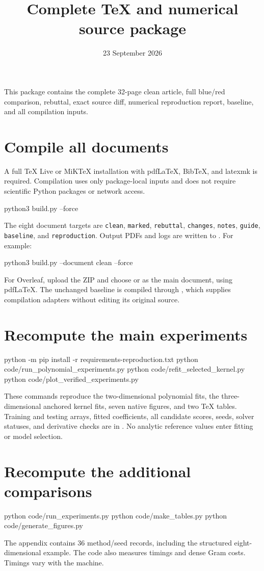 \documentclass[11pt,a4paper]{article}
\title{Complete TeX and numerical source package}\author{}\date{23 September 2026}
\begin{document}
\maketitle
This package contains the complete 32-page clean article, full blue/red comparison, rebuttal, exact source diff, numerical reproduction report, baseline, and all compilation inputs.
\section*{Compile all documents}
A full TeX Live or MiKTeX installation with pdfLaTeX, BibTeX, and latexmk is required. Compilation uses only package-local inputs and does not require scientific Python packages or network access.
\begin{Commands}
python3 build.py --force
\end{Commands}
The eight document targets are \texttt{clean}, \texttt{marked}, \texttt{rebuttal}, \texttt{changes}, \texttt{notes}, \texttt{guide}, \texttt{baseline}, and \texttt{reproduction}. Output PDFs and logs are written to . For example:
\begin{Commands}
python3 build.py --document clean --force
\end{Commands}
For Overleaf, upload the ZIP and choose  or  as the main document, using pdfLaTeX. The unchanged baseline is compiled through , which supplies compilation adapters without editing its original source.

\section*{Recompute the main experiments}
\begin{Commands}
python -m pip install -r requirements-reproduction.txt
python code/run_polynomial_experiments.py
python code/refit_selected_kernel.py
python code/plot_verified_experiments.py
\end{Commands}
These commands reproduce the two-dimensional polynomial fits, the three-dimensional anchored kernel fits, seven native figures, and two TeX tables. Training and testing arrays, fitted coefficients, all candidate scores, seeds, solver statuses, and derivative checks are in . No analytic reference values enter fitting or model selection.

\section*{Recompute the additional comparisons}
\begin{Commands}
python code/run_experiments.py
python code/make_tables.py
python code/generate_figures.py
\end{Commands}
The appendix contains 36 method/seed records, including the structured eight-dimensional example. The code also measures timings and dense Gram costs. Timings vary with the machine.
\end{document}
